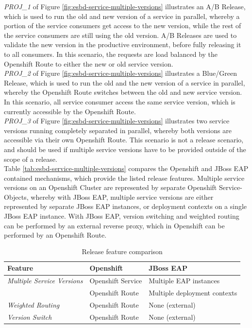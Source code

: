 \emph{PROJ\_1} of Figure \vref{fig:esbd-service-multiple-versions} illustrates an A/B Release, which is used to run the old and new version of a service in parallel, whereby a portion of the service consumers get access to the new version, while the rest of the service consumers are still using the old version. A/B Releases are used to validate the new version in the productive environment, before fully releasing it to all consumers. In this scenario, the requests are load balanced by the Openshift Route to either the new or old service version. \\ 

\emph{PROJ\_2} of Figure \vref{fig:esbd-service-multiple-versions} illustrates a Blue/Green Release, which is used to run the old and the new version of a service in parallel, whereby the Openshift Route switches between the old and new service version. In this scenario, all service consumer access the same service version, which is currently accessible by the Openshift Route. \\

\emph{PROJ\_3} of Figure \vref{fig:esbd-service-multiple-versions} illustrates two service versions running completely separated in parallel, whereby both versions are accessible via their own Openshift Route. This scenario is not a release scenario, and should be used if multiple service versions have to be provided outside of the scope of a release. \\

Table \vref{tab:esbd-service-multiple-versions} compares the Openshift and JBoss EAP contained mechanisms, which provide the listed release features. Multiple service versions on an Openshift Cluster are represented by separate Openshift Service-Objects, whereby with JBoss EAP, multiple service versions are either represented by separate JBoss EAP instances, or deployment contexts on a single JBoss EAP instance. With JBoss EAP, version switching and weighted routing can be performed by an external reverse proxy, which in Openshift can be performed by an Openshift Route.

{\renewcommand{\arraystretch}{1.2}%
	\begin{table}[h]
		\begin{tabularx}{\textwidth}{ X|X|X }	
			\textbf{Feature}                  & \textbf{Openshift}      & \textbf{JBoss EAP} \\  \hline
			\textit{Multiple Service Versions}& Openshift Service       & Multiple EAP instances \\
											  & Openshift Route    	    & Multiple deployment contexts \\ \hline
			\textit{Weighted Routing}         & Openshift Route         & None (external) \\  \hline
			\textit{Version Switch}           & Openshift Route         & None (external) \\  \hline
		\end{tabularx}
		\caption{Release feature comparison}
		\label{tab:esbd-service-multiple-versions}
\end{table}}

